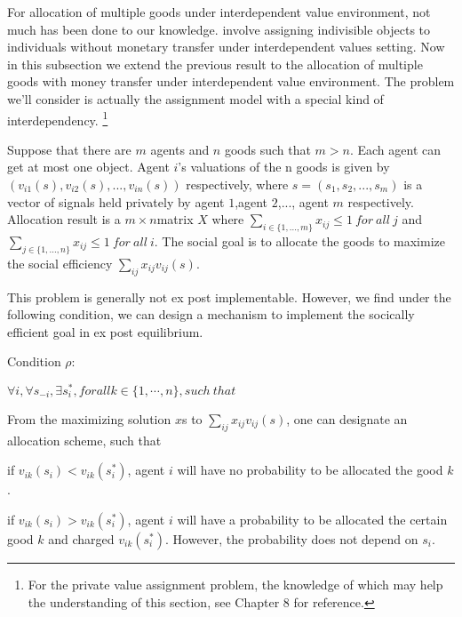 For allocation of multiple goods under interdependent value environment, not much has been done to our knowledge. \parencite{Che2015} involve assigning indivisible objects to individuals without monetary transfer under interdependent values setting. Now in this subsection we extend the previous result to the allocation of multiple goods with money transfer under interdependent value environment.  The problem we'll consider is actually the assignment model with a special kind of interdependency. \footnote{For the private value assignment problem, the knowledge of which may help the understanding of this section, see Chapter 8 \parencite{Roth1990}for reference.} 

Suppose that there are $m$ agents and $n$ goods such that $m > n$. Each agent can get at most one object.   Agent $i$'s valuations of the n goods is given by $(v_{i1}(s),v_{i2}(s),...,v_{in}(s))$ respectively, where $s=(s_1,s_2,...,s_m)$ is a vector of signals held privately by agent $1$,agent $2$,..., agent $m$ respectively. Allocation result is a $m \times n$matrix $X$ where $\sum_{i\in\{1,...,m\}}x_{ij} \leq 1\ for\ all\ j$ and  $\sum_{j\in\{1,...,n\}}x_{ij} \leq 1\ for\ all\ i$. The social goal is to allocate the goods to maximize the social efficiency $\sum_{ij}x_{ij}v_{ij}(s)$.

This problem is generally not ex post implementable. However, we find under the following condition, we can design a mechanism to implement the socically efficient goal in ex post equilibrium.

Condition $\rho$:

$\forall i,\forall s_{-i}, \exists s_i^*,for all k \in \{1,\cdots,n\}, such\ that $

From the maximizing solution $x$s to  $\sum_{ij}x_{ij}v_{ij}(s)$, one can designate an allocation scheme, such that


if $v_{ik}(s_i) < v_{ik}(s_i^*)$, agent $i$ will have no probability to be allocated the good $k$. %

if $v_{ik}(s_i) > v_{ik}(s_i^*)$, agent $i$ will have a probability to be allocated the certain good $k$ and charged $ v_{ik}(s_i^*)$. However, the probability does not depend on $s_i$. %


